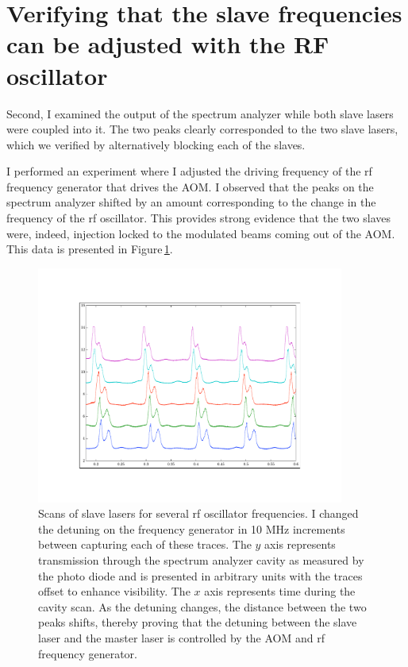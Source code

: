 \section{Verifying that the slave frequencies can be adjusted with the RF oscillator}
Second, I examined the output of the spectrum analyzer while both slave lasers were coupled into it. 
The two peaks clearly corresponded to the two slave lasers, which we verified by alternatively blocking each of the slaves. 


I performed an experiment where I adjusted the driving frequency of the rf frequency generator that drives the AOM. I observed that the peaks on the spectrum analyzer shifted by an amount corresponding to the change in the frequency of the rf oscillator. This provides strong evidence that the two slaves were, indeed, injection locked to the modulated beams coming out of the AOM. This data is presented in Figure\,\ref{fig:typicaldata}.


 
\begin{figure}
    \centerline{\includegraphics[width=0.9\textwidth]{sampleOffsetData}}
    \caption[Scans of slave lasers for several rf oscillator frequencies]{\label{fig:typicaldata}
Scans of slave lasers for several rf oscillator frequencies. I changed the detuning on the frequency generator in 10 MHz increments between capturing each of these traces. The $y$ axis represents transmission through the spectrum analyzer cavity as measured by the photo diode and is presented in arbitrary units with the traces offset to enhance visibility. The $x$ axis represents time during the cavity scan. As the detuning changes, the distance between the two peaks shifts, thereby proving that the detuning between the slave laser and the master laser is controlled by the AOM and rf frequency generator.}
\end{figure}

